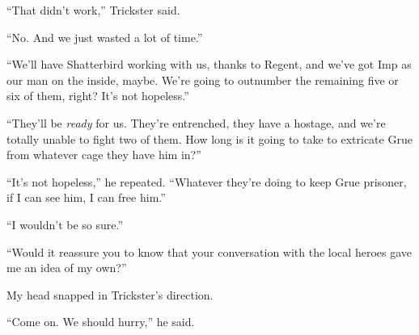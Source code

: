 ``That didn't work,'' Trickster said.



``No.  And we just wasted a lot of time.''



``We'll have Shatterbird working with us, thanks to Regent, and we've got Imp as our man on the inside, maybe.  We're going to outnumber the remaining five or six of them, right?  It's not hopeless.''



``They'll be \emph{ready} for us.  They're entrenched, they have a hostage, and we're totally unable to fight two of them.  How long is it going to take to extricate Grue from whatever cage they have him in?''



``It's not hopeless,'' he repeated.  ``Whatever they're doing to keep Grue prisoner, if I can see him, I can free him.''



``I wouldn't be so sure.''



``Would it reassure you to know that your conversation with the local heroes gave me an idea of my own?''



My head snapped in Trickster's direction.



``Come on.  We should hurry,'' he said.





